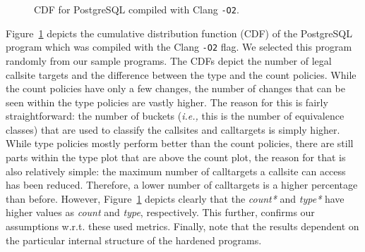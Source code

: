 \begin{figure}[h] 
\vspace{-.6cm}
  \begin{minipage}[b]{1.0\linewidth}
    \centering
    \resizebox{.9\columnwidth}{!}{}
    \vspace{-.4cm}
    \caption{CDF for PostgreSQL compiled with Clang \texttt{-O2}.} 
    \label{fig7} 
    \vspace{1ex}
  \end{minipage}%
\vspace{-.3cm}
\end{figure}
Figure~\ref{fig7}
depicts the cumulative distribution function (CDF) of the PostgreSQL program which was compiled with the Clang \texttt{-O2} flag. 
We selected this program randomly from our sample programs. 
The CDFs depict the number of legal callsite targets and the difference between the type and the count policies. 
While the count  policies have only a few changes, the number of changes that can be seen within the 
type policies are vastly higher. The reason for this is fairly straightforward: the number 
of buckets (\textit{i.e.,} this is the number of equivalence classes)
that are used to classify the callsites and calltargets is simply higher. While type policies mostly 
perform better than the count policies, there are still parts within the type plot that are above the 
count plot, the reason for that is also relatively simple: the maximum number of calltargets a 
callsite can access has been reduced. Therefore, a lower number of calltargets is a higher 
percentage than before. However, Figure~\ref{fig7} depicts clearly
that the \textit{count*} and \textit{type*} have higher values as 
\textit{count} and \textit{type}, respectively. This further, confirms our assumptions 
w.r.t. these used metrics. Finally, note that the results dependent on the particular 
internal structure of the hardened programs.

